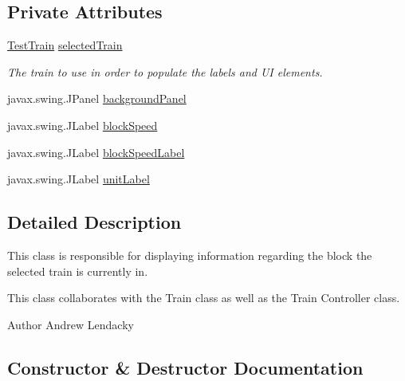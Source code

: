 \subsection*{Private Attributes}
\begin{DoxyCompactItemize}
\item 
\hyperlink{classTrainControllerComps_1_1TestTrain}{Test\+Train} \hyperlink{classTrainControllerComps_1_1TCBlockInfoPanel_a26dda8277000855ca35d16e6bdb97665}{selected\+Train}
\begin{DoxyCompactList}\small\item\em The train to use in order to populate the labels and UI elements. \end{DoxyCompactList}\item 
javax.\+swing.\+J\+Panel \hyperlink{classTrainControllerComps_1_1TCBlockInfoPanel_a6a9c969b6131a6e6f3d01fd2a9434d6d}{background\+Panel}
\item 
javax.\+swing.\+J\+Label \hyperlink{classTrainControllerComps_1_1TCBlockInfoPanel_a3b3aa9808843291162c5f169c7aea308}{block\+Speed}
\item 
javax.\+swing.\+J\+Label \hyperlink{classTrainControllerComps_1_1TCBlockInfoPanel_a4e08f23bf589fc1e8b361f7473f54127}{block\+Speed\+Label}
\item 
javax.\+swing.\+J\+Label \hyperlink{classTrainControllerComps_1_1TCBlockInfoPanel_a6038128e0c97c299a84e81d8e77b6215}{unit\+Label}
\end{DoxyCompactItemize}


\subsection{Detailed Description}
This class is responsible for displaying information regarding the block the selected train is currently in. 

This class collaborates with the Train class as well as the Train Controller class.

\begin{DoxyAuthor}{Author}
Andrew Lendacky 
\end{DoxyAuthor}


\subsection{Constructor \& Destructor Documentation}
\mbox{\label{classTrainControllerComps_1_1TCBlockInfoPanel_a44a1b4c66f0a95faae3698b9a37cd71c}} 
